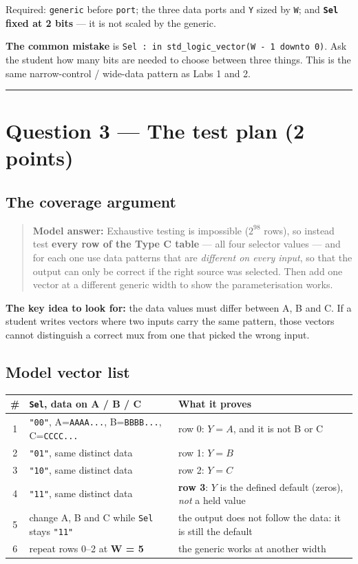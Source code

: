 \documentclass[11pt]{article}
\newcommand{\code}[1]{\texttt{#1}}
\newcommand{\hr}{\vspace{2pt}\hrule\vspace{6pt}}
\begin{document}
Required: \code{generic} before \code{port}; the three data ports and \code{Y}
sized by \code{W}; and \textbf{\code{Sel} fixed at 2 bits} --- it is not scaled by
the generic.

\textbf{The common mistake} is \code{Sel : in std\_logic\_vector(W - 1 downto 0)}.
Ask the student how many bits are needed to choose between three things. This is
the same narrow-control / wide-data pattern as Labs 1 and 2.

\vspace{4pt}\hr

\section*{Question 3 --- The test plan (2 points)}

\subsection*{The coverage argument}

\begin{quote}
\textbf{Model answer:} Exhaustive testing is impossible ($2^{98}$ rows), so
instead test \textbf{every row of the Type C table} --- all four selector values
--- and for each one use data patterns that are \emph{different on every input},
so that the output can only be correct if the right source was selected. Then add
one vector at a different generic width to show the parameterisation works.
\end{quote}

\textbf{The key idea to look for:} the data values must differ between A, B and C.
If a student writes vectors where two inputs carry the same pattern, those
vectors cannot distinguish a correct mux from one that picked the wrong input.

\subsection*{Model vector list}

\begin{center}
\small
\begin{tabular}{c>{\raggedright\arraybackslash}p{5.4cm}>{\raggedright\arraybackslash}p{7.2cm}}
\toprule
\# & \code{Sel}, data on A / B / C & What it proves \\
\midrule
1 & \code{"00"}, A=\code{AAAA...}, B=\code{BBBB...}, C=\code{CCCC...} & row 0: $Y = A$, and it is not B or C \\
2 & \code{"01"}, same distinct data & row 1: $Y = B$ \\
3 & \code{"10"}, same distinct data & row 2: $Y = C$ \\
4 & \code{"11"}, same distinct data & \textbf{row 3}: $Y$ is the defined default (zeros), \emph{not} a held value \\
5 & change A, B and C while \code{Sel} stays \code{"11"} & the output does not follow the data: it is still the default \\
6 & repeat rows 0--2 at \textbf{W = 5} & the generic works at another width \\
\bottomrule
\end{tabular}
\end{center}
\end{document}
